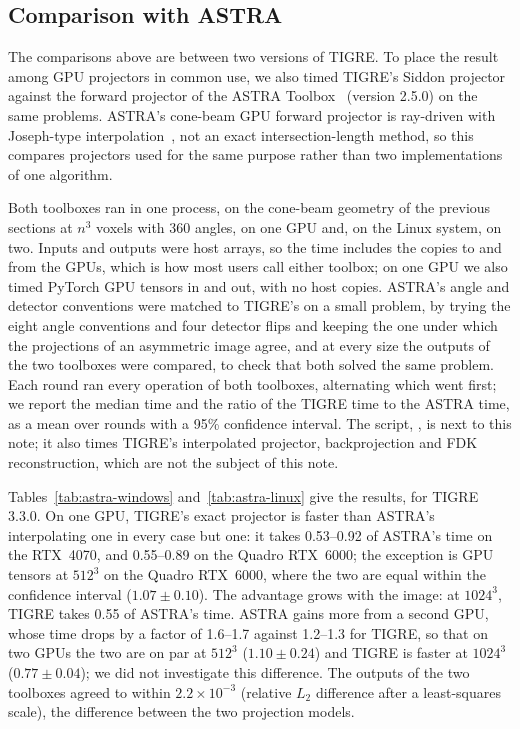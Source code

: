 \documentclass[11pt,a4paper]{article}
\theoremstyle{remark}
\begin{document}
\subsection{Comparison with ASTRA}
\label{sec:astra}

The comparisons above are between two versions of TIGRE. To place the result among GPU projectors in common
use, we also timed TIGRE's Siddon projector against the forward projector of the ASTRA Toolbox~\cite{astra2016}
(version 2.5.0) on the same problems. ASTRA's cone-beam GPU forward projector is ray-driven with Joseph-type
interpolation~\cite{joseph1982}, not an exact intersection-length method, so this compares projectors used for
the same purpose rather than two implementations of one algorithm.

Both toolboxes ran in one process, on the cone-beam geometry of the previous sections at $n^3$ voxels with 360
angles, on one GPU and, on the Linux system, on two. Inputs and outputs were host arrays, so the time includes the copies to and from
the GPUs, which is how most users call either toolbox; on one GPU we also timed PyTorch GPU tensors in and out,
with no host copies. ASTRA's angle and detector conventions were matched to TIGRE's on a small problem, by
trying the eight angle conventions and four detector flips and keeping the one under which the projections of
an asymmetric image agree, and at every size the outputs of the two toolboxes were compared, to check that both
solved the same problem. Each round ran every operation of both toolboxes, alternating which went first; we
report the median time and the ratio of the TIGRE time to the ASTRA time, as a mean over rounds with a 95\%
confidence interval. The script, , is next to this note; it also times TIGRE's
interpolated projector, backprojection and FDK reconstruction, which are not the subject of this note.


Tables~\ref{tab:astra-windows} and~\ref{tab:astra-linux} give the results, for TIGRE 3.3.0. On one GPU, TIGRE's
exact projector is faster than ASTRA's interpolating one in every case but one: it takes 0.53--0.92 of ASTRA's
time on the RTX~4070, and 0.55--0.89 on the Quadro RTX~6000; the exception is GPU tensors at $512^3$ on the Quadro
RTX~6000, where the two are equal within the confidence interval ($1.07\pm0.10$). The advantage grows with the
image: at $1024^3$, TIGRE takes 0.55 of ASTRA's time. ASTRA gains more from a second GPU, whose time drops by a
factor of 1.6--1.7 against 1.2--1.3 for TIGRE, so that on two GPUs the two are on par at $512^3$
($1.10\pm0.24$) and TIGRE is faster at $1024^3$ ($0.77\pm0.04$); we did not investigate this difference. The
outputs of the two toolboxes agreed to within $2.2\times10^{-3}$ (relative $L_2$ difference after a
least-squares scale), the difference between the two projection models.
\end{document}
